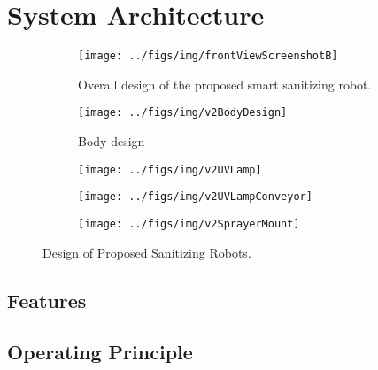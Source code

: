 \documentclass[letterpaper]{article} %
\begin{document}




\section{System Architecture}
\label{sec:SystemArchitecture}


\begin{figure}[htpb]
  \centering
  \begin{subfigure}[b]{0.5\textwidth}
    \centering
    \texttt{[image: ../figs/img/frontViewScreenshotB]}
    \caption{Overall design of the proposed smart sanitizing robot.}
    \label{fig:frontViewScreenshotB}
  \end{subfigure}
  \begin{subfigure}[b]{.5\textwidth}
    \centering
    \texttt{[image: ../figs/img/v2BodyDesign]}
    \caption{Body design}
  \end{subfigure}
  \begin{subfigure}[b]{.5\textwidth}
    \centering
    \texttt{[image: ../figs/img/v2UVLamp]}
  \end{subfigure}
  \begin{subfigure}[b]{.5\textwidth}
    \centering
    \texttt{[image: ../figs/img/v2UVLampConveyor]}
  \end{subfigure}
  \begin{subfigure}[b]{.5\textwidth}
    \centering
    \texttt{[image: ../figs/img/v2SprayerMount]}
  \end{subfigure}
  \caption{Design of Proposed Sanitizing Robots.}
  \label{fig:ArchitecturesOfSanitizingRobot}
\end{figure}


\subsection{Features}
\label{sec:Features}

\subsection{Operating Principle}
\label{sec:OperatingPrinciple}
\end{document}
